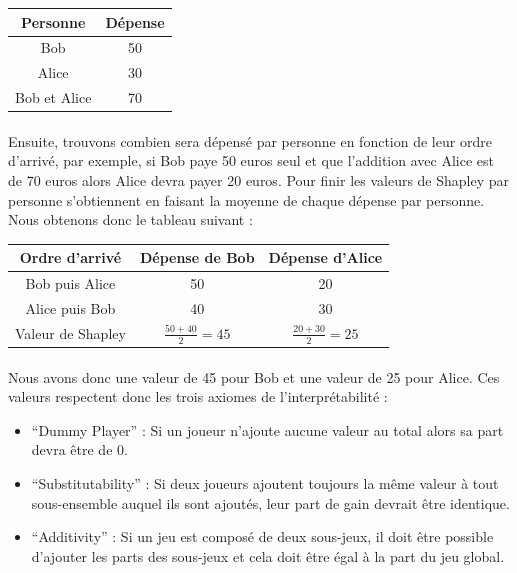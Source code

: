 \documentclass[10pt, french, a4paper]{report}
\begin{document}
\begin{center}
  \begin{tabular}{ |c|c| } 
   \hline
   Personne & Dépense \\ 
   \hline
   Bob & 50 \\
   Alice & 30 \\
   Bob et Alice & 70 \\
   \hline
  \end{tabular}
\end{center}

\paragraph{}
Ensuite, trouvons combien sera dépensé par personne en fonction de leur ordre d’arrivé, par exemple, si Bob paye 50 euros seul et que l’addition avec Alice est de 70 euros alors Alice devra payer 20 euros. Pour finir les valeurs de Shapley par personne s’obtiennent en faisant la moyenne de chaque dépense par personne. Nous obtenons donc le tableau suivant :


\begin{center}
  \begin{tabular}{ |c|c|c| } 
   \hline
   Ordre d’arrivé & Dépense de Bob & Dépense d’Alice \\ 
   \hline
   Bob puis Alice & 50 & 20 \\
   Alice puis Bob & 40 & 30 \\
   \hline
   Valeur de Shapley & $\frac{50+40}{2} = 45$ & $\frac{20+30}{2} = 25$ \\
   \hline
  \end{tabular}
\end{center}

\paragraph{}
Nous avons donc une valeur de 45 pour Bob et une valeur de 25 pour Alice. Ces valeurs respectent donc les trois axiomes de l’interprétabilité :
\begin{itemize}
  \item ``Dummy Player'' : Si un joueur n’ajoute aucune valeur au total alors sa part devra être de 0.
  \item ``Substitutability'' : Si deux joueurs ajoutent toujours la même valeur à tout sous-ensemble auquel ils sont ajoutés, leur part de gain devrait être identique.
  \item ``Additivity'' : Si un jeu est composé de deux sous-jeux, il doit être possible d’ajouter les parts des sous-jeux et cela doit être égal à la part du jeu global.
\end{itemize}
\end{document}
